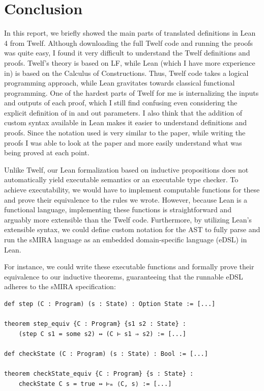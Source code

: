 \documentclass[]{NobArticle}
\begin{document}
\section{Conclusion}

In this report, we briefly showed the main parts of translated definitions in Lean 4 from Twelf. Although downloading the full Twelf code and running the proofs was quite easy, I found it very difficult to understand the Twelf definitions and proofs. Twelf's theory is based on LF, while Lean (which I have more experience in) is based on the Calculus of Constructions. Thus, Twelf code takes a logical programming approach, while Lean gravitates towards classical functional programming. One of the hardest parts of Twelf for me is internalizing the inputs and outputs of each proof, which I still find confusing even considering the explicit definition of in and out parameters. I also think that the addition of custom syntax available in Lean makes it easier to understand definitions and proofs. Since the notation used is very similar to the paper, while writing the proofs I was able to look at the paper and more easily understand what was being proved at each point.

Unlike Twelf, our Lean formalization based on inductive propositions does not automatically yield executable semantics or an executable type checker. To achieve executability, we would have to implement computable functions for these and prove their equivalence to the rules we wrote. However, because Lean is a functional language, implementing these functions is straightforward and arguably more extensible than the Twelf code. Furthermore, by utilizing Lean's extensible syntax, we could define custom notation for the AST to fully parse and run the sMIRA language as an embedded domain-specific language (eDSL) in Lean.

For instance, we could write these executable functions and formally prove their equivalence to our inductive theorems, guaranteeing that the runnable eDSL adheres to the sMIRA specification:

\begin{minipage}{\linewidth}
\begin{lstlisting}
def step (C : Program) (s : State) : Option State := [...]

theorem step_equiv {C : Program} {s1 s2 : State} :
    (step C s1 = some s2) ↔ (C ⊢ s1 ⇒ s2) := [...]

def checkState (C : Program) (s : State) : Bool := [...]

theorem checkState_equiv {C : Program} {s : State} :
    checkState C s = true ↔ ⊢ₘ ⟨C, s⟩ := [...]
\end{lstlisting}
\end{minipage}
\end{document}
